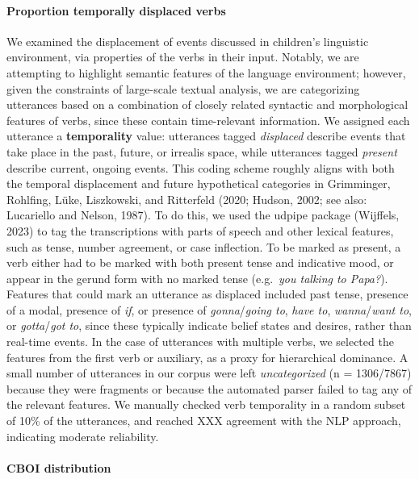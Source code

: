 \documentclass[
  man,floatsintext]{apa6}
\let\oldparagraph\paragraph
\renewcommand{\paragraph}[1]{\oldparagraph{#1}\mbox{}}
\begin{document}
\hypertarget{proportion-temporally-displaced-verbs}{%
\paragraph{Proportion temporally displaced verbs}\label{proportion-temporally-displaced-verbs}}

We examined the displacement of events discussed in children's linguistic environment, via properties of the verbs in their input. Notably, we are attempting to highlight semantic features of the language environment; however, given the constraints of large-scale textual analysis, we are categorizing utterances based on a combination of closely related syntactic and morphological features of verbs, since these contain time-relevant information. We assigned each utterance a \textbf{temporality} value: utterances tagged \emph{displaced} describe events that take place in the past, future, or irrealis space, while utterances tagged \emph{present} describe current, ongoing events. This coding scheme roughly aligns with both the temporal displacement and future hypothetical categories in Grimminger, Rohlfing, Lüke, Liszkowski, and Ritterfeld (2020; Hudson, 2002; see also: Lucariello and Nelson, 1987). To do this, we used the udpipe package (Wijffels, 2023) to tag the transcriptions with parts of speech and other lexical features, such as tense, number agreement, or case inflection. To be marked as present, a verb either had to be marked with both present tense and indicative mood, or appear in the gerund form with no marked tense (e.g.~\emph{you talking to Papa?}). Features that could mark an utterance as displaced included past tense, presence of a modal, presence of \emph{if}, or presence of \emph{gonna}/\emph{going to}, \emph{have to}, \emph{wanna}/\emph{want to}, or \emph{gotta}/\emph{got to}, since these typically indicate belief states and desires, rather than real-time events. In the case of utterances with multiple verbs, we selected the features from the first verb or auxiliary, as a proxy for hierarchical dominance. A small number of utterances in our corpus were left \emph{uncategorized} (n = 1306/7867) because they were fragments or because the automated parser failed to tag any of the relevant features. We manually checked verb temporality in a random subset of 10\% of the utterances, and reached XXX agreement with the NLP approach, indicating moderate reliability.

\hypertarget{cboi-distribution}{%
\paragraph{CBOI distribution}\label{cboi-distribution}}
\end{document}
